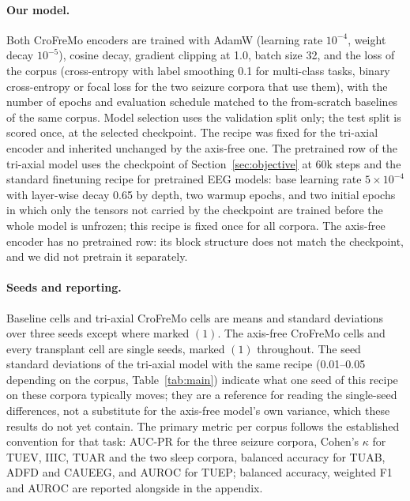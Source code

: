 \paragraph{Our model.}
Both CroFreMo encoders are trained with AdamW (learning rate $10^{-4}$,
weight decay $10^{-5}$), cosine decay, gradient clipping at 1.0, batch
size 32, and the loss of the corpus (cross-entropy with label smoothing
0.1 for multi-class tasks, binary cross-entropy or focal loss for the two
seizure corpora that use them), with the number of epochs and evaluation
schedule matched to the from-scratch baselines of the same corpus. Model
selection uses the validation split only; the test split is scored once,
at the selected checkpoint. The recipe was fixed for the tri-axial encoder
and inherited unchanged by the axis-free one. The pretrained row of the
tri-axial model uses the checkpoint of Section~\ref{sec:objective} at 60k
steps and the standard finetuning recipe for pretrained EEG models: base
learning rate $5\times10^{-4}$ with layer-wise decay 0.65 by depth, two
warmup epochs, and two initial epochs in which only the tensors not
carried by the checkpoint are trained before the whole model is unfrozen;
this recipe is fixed once for all corpora. The axis-free encoder has no
pretrained row: its block structure does not match the checkpoint, and we
did not pretrain it separately.

\paragraph{Seeds and reporting.}
Baseline cells and tri-axial CroFreMo cells are means and standard
deviations over three seeds except where marked $(1)$. The axis-free
CroFreMo cells and every transplant cell are single seeds, marked $(1)$
throughout. The seed standard deviations of the tri-axial model with the
same recipe (0.01--0.05 depending on the corpus, Table~\ref{tab:main})
indicate what one seed of this recipe on these corpora typically moves;
they are a reference for reading the single-seed differences, not a
substitute for the axis-free model's own variance, which these results
do not yet contain. The primary metric per corpus
follows the established convention for that task: AUC-PR for the three
seizure corpora, Cohen's $\kappa$ for TUEV, IIIC, TUAR and the two sleep
corpora, balanced accuracy for TUAB, ADFD and CAUEEG, and AUROC for TUEP;
balanced accuracy, weighted F1 and AUROC are reported alongside in the
appendix.

